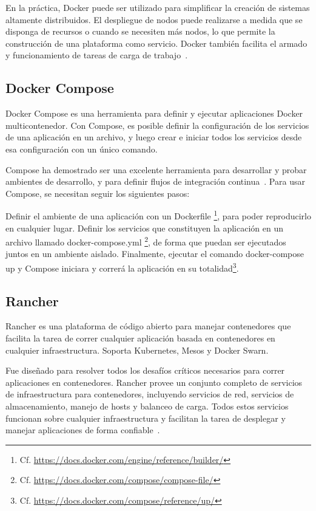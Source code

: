 En la práctica, Docker puede ser utilizado para simplificar la creación de
sistemas altamente distribuidos. El despliegue de nodos puede realizarse a
medida que se disponga de recursos o cuando se necesiten más nodos, lo que
permite la construcción de una plataforma como servicio. Docker también
facilita el armado y funcionamiento de tareas de carga de
trabajo~\cite{docker}.

\subsection{Docker Compose}
\label{anexo_compose}

Docker Compose es una herramienta para definir y ejecutar aplicaciones Docker
multicontenedor. Con Compose, es posible definir la configuración de los
servicios de una aplicación en un archivo, y luego crear e iniciar todos los
servicios desde esa configuración con un único comando.

Compose ha demostrado ser una excelente herramienta para desarrollar y probar
ambientes de desarrollo, y para definir flujos de integración
continua~\cite{compose}. Para usar Compose, se necesitan seguir los siguientes
pasos:

Definir el ambiente de una aplicación con un Dockerfile
\footnote{Cf. \url{https://docs.docker.com/engine/reference/builder/}}, para
poder reproducirlo en cualquier lugar.  Definir los servicios que constituyen
la aplicación en un archivo llamado docker-compose.yml
\footnote{Cf.  \url{https://docs.docker.com/compose/compose-file/}}, de forma
que puedan ser ejecutados juntos en un ambiente aislado.  Finalmente, ejecutar
el comando docker-compose up y Compose iniciara y correrá la aplicación en su
totalidad\footnote{Cf. \url{https://docs.docker.com/compose/reference/up/}}.


\subsection{Rancher}

Rancher es una plataforma de código abierto para manejar contenedores que
facilita la tarea de correr cualquier aplicación basada en contenedores en
cualquier infraestructura. Soporta Kubernetes, Mesos y Docker Swarn.

Fue diseñado para resolver todos los desafíos críticos necesarios para correr
aplicaciones en contenedores. Rancher provee un conjunto completo de servicios
de infraestructura para contenedores, incluyendo servicios de red, servicios de
almacenamiento, manejo de hosts y balanceo de carga. Todos estos servicios
funcionan sobre cualquier infraestructura y facilitan la tarea de desplegar y
manejar aplicaciones de forma confiable~\cite{rancher}.

